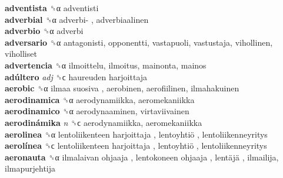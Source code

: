 \textbf{adventista} ␝α  adventisti  \\
\textbf{adverbial} ␝α   adverbi- , adverbiaalinen  \\
\textbf{adverbio} ␝α  adverbi  \\
\textbf{adversario} ␝α  antagonisti, opponentti, vastapuoli, vastustaja, vihollinen, viholliset  \\
\textbf{advertencia} ␝α  ilmoittelu, ilmoitus, mainonta, mainos  \\
\textbf{adúltero} \emph{adj}  ␝ϲ   haureuden harjoittaja   \\
\textbf{aerobic} ␝α   ilmaa suosiva , aerobinen, aerofiilinen, ilmahakuinen  \\
\textbf{aerodinamica} ␝α  aerodynamiikka, aeromekaniikka  \\
\textbf{aerodinamico} ␝α  aerodynaaminen, virtaviivainen  \\
\textbf{aerodinámika} \emph{n}  ␝ϲ  aerodynamiikka, aeromekaniikka  \\
\textbf{aerolinea} ␝α   lentoliikenteen harjoittaja ,  lentoyhtiö , lentoliikenneyritys  \\
\textbf{aerolínea} ␝ϲ   lentoliikenteen harjoittaja ,  lentoyhtiö , lentoliikenneyritys  \\
\textbf{aeronauta} ␝α   ilmalaivan ohjaaja ,  lentokoneen ohjaaja ,  lentäjä , ilmailija, ilmapurjehtija  \\
